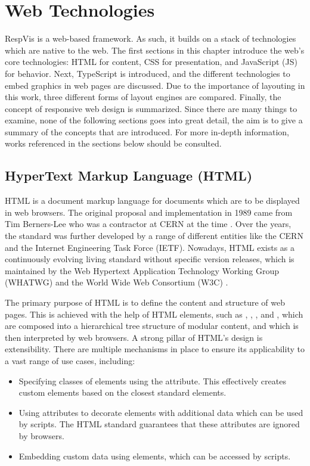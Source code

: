 
\chapter{Web Technologies}
\label{chap:WebTechnologies}

RespVis is a web-based framework. As such, it builds on a stack of
technologies which are native to the web. The first sections in this
chapter introduce the web's core technologies: HTML for content, CSS
for presentation, and JavaScript (JS) for behavior. Next, TypeScript
is introduced, and the different technologies to embed graphics in web
pages are discussed. Due to the importance of layouting in this work,
three different forms of layout engines are compared. Finally, the
concept of responsive web design is summarized. Since there are many
things to examine, none of the following sections goes into great
detail, the aim is to give a summary of the concepts that are
introduced. For more in-depth information, works referenced in the
sections below should be consulted.


\section{HyperText Markup Language (HTML)}
\label{sec:HTML}

HTML is a document markup language for documents which are to be
displayed in web browsers. The original proposal and implementation in
1989 came from Tim Berners-Lee who was a contractor at CERN at the
time \parencite{TBLProposal}. Over the years, the standard was further
developed by a range of different entities like the CERN and the
Internet Engineering Task Force (IETF). Nowadays, HTML exists as a
continuously evolving living standard without specific version
releases, which is maintained by the Web Hypertext Application
Technology Working Group (WHATWG) and the World Wide Web Consortium
(W3C) \parencite{HTML}.

The primary purpose of HTML is to define the content and structure of
web pages. This is achieved with the help of HTML elements, such as
, , , and ,
which are composed into a hierarchical tree structure of modular
content, and which is then interpreted by web browsers. A strong
pillar of HTML's design is extensibility. There are multiple
mechanisms in place to ensure its applicability to a vast range of use
cases, including:
\begin{itemize}
\item Specifying classes of elements using the 
  attribute. This effectively creates custom elements based on the
  closest standard elements.

\item Using  attributes to decorate elements with
  additional data which can be used by scripts. The HTML standard
  guarantees that these attributes are ignored by browsers.

\item Embedding custom data using  elements,
  which can be accessed by scripts.
\end{itemize}





